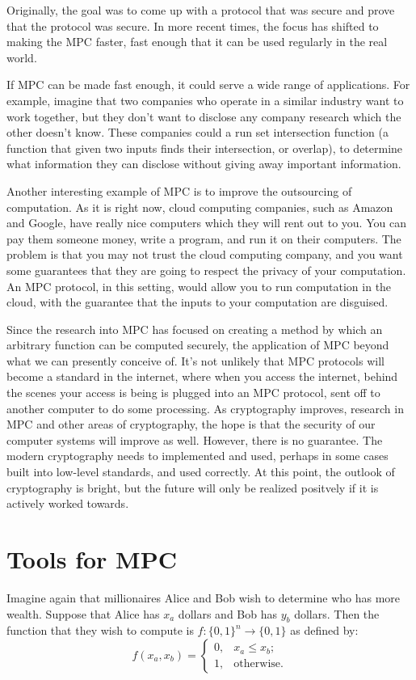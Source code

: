 \documentclass[12pt,twoside]{reedthesis}
\begin{document}
Originally, the goal was to come up with a protocol that was secure and prove that the protocol was secure. 
In more recent times, the focus has shifted to making the MPC faster, fast enough that it can be used regularly in the real world.

If MPC can be made fast enough, it could serve a wide range of applications.
For example, imagine that two companies who operate in a similar industry want to work together, but they don't want to disclose any company research which the other doesn't know.
These companies could a run set intersection function (a function that given two inputs finds their intersection, or overlap), to determine what information they can disclose without giving away important information.

Another interesting example of MPC is to improve the outsourcing of computation.
As it is right now, cloud computing companies, such as Amazon and Google, have really nice computers which they will rent out to you. 
You can pay them someone money, write a program, and run it on their computers. 
The problem is that you may not trust the cloud computing company, and you want some guarantees that they are going to respect the privacy of your computation.
An MPC protocol, in this setting, would allow you to run computation in the cloud, with the guarantee that the inputs to your computation are disguised.

Since the research into MPC has focused on creating a method by which an arbitrary function can be computed securely, the application of MPC beyond what we can presently conceive of. 
It's not unlikely that MPC protocols will become a standard in the internet, where when you access the internet, behind the scenes your access is being is plugged into an MPC protocol, sent off to another computer to do some processing. 
As cryptography improves, research in MPC and other areas of cryptography, the hope is that the security of our computer systems will improve as well.
However, there is no guarantee. 
The modern cryptography needs to implemented and used, perhaps in some cases built into low-level standards, and used correctly.
At this point, the outlook of cryptography is bright, but the future will only be realized positvely if it is actively worked towards.

\section{Tools for MPC}
Imagine again that millionaires Alice and Bob wish to determine who has more wealth.
Suppose that Alice has $x_a$ dollars and Bob has $y_b$ dollars.
Then the function that they wish to compute is $f: \{0,1\}^n \to \{0,1\}$ as defined by:
\begin{equation}
    \label{eqn:less_than}
    f(x_a,x_b) = 
    \begin{cases}
    0, & x_a \leq x_b; \\
    1, & \text{otherwise}.
    \end{cases}
\end{equation}
\end{document}
